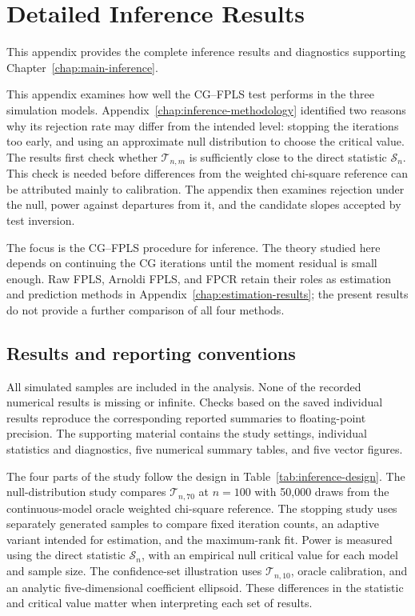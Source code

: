 \chapter{Detailed Inference Results}
\label{chap:inference-results}

This appendix provides the complete inference results and diagnostics supporting
Chapter~\ref{chap:main-inference}.

This appendix examines how well the CG--FPLS test performs in the three
simulation models.  Appendix~\ref{chap:inference-methodology} identified two
reasons why its rejection rate may differ from the intended level: stopping
the iterations too early, and using an approximate null distribution to
choose the critical value.  The results first check whether
$\mathcal T_{n,m}$ is sufficiently close to the direct statistic
$\mathcal S_n$.  This check is needed before differences from the weighted
chi-square reference can be attributed mainly to calibration.  The appendix
then examines rejection under the null, power against departures from it,
and the candidate slopes accepted by test inversion.

The focus is the CG--FPLS procedure for inference.  The theory studied here
depends on continuing the CG iterations until the moment residual is small
enough.  Raw FPLS, Arnoldi FPLS, and FPCR retain their roles as estimation and
prediction methods in Appendix~\ref{chap:estimation-results}; the present
results do not provide a further comparison of all four methods.

\section{Results and reporting conventions}
\label{sec:inference-results-verification}

All simulated samples are included in the analysis.  None of the recorded
numerical results is missing or infinite.  Checks based on the saved
individual results reproduce the corresponding reported summaries to
floating-point precision.  The supporting material contains the study
settings, individual statistics and diagnostics, five numerical summary
tables, and five vector figures.

The four parts of the study follow the design in
Table~\ref{tab:inference-design}.  The null-distribution study compares
$\mathcal T_{n,70}$ at $n=100$ with 50,000 draws from the continuous-model
oracle weighted chi-square reference.  The stopping study uses separately
generated samples to compare fixed iteration counts, an adaptive variant
intended for estimation, and the maximum-rank fit.  Power is measured using
the direct statistic $\mathcal S_n$, with an empirical null critical value
for each model and sample size.  The confidence-set illustration uses
$\mathcal T_{n,10}$, oracle calibration, and an analytic five-dimensional
coefficient ellipsoid.  These differences in the statistic and critical
value matter when interpreting each set of results.

